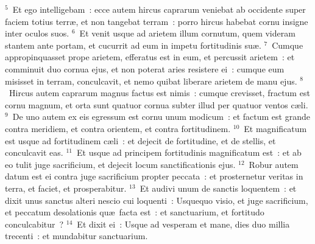 ${}^{5}$~Et ego intelligebam~: ecce autem hircus caprarum veniebat ab occidente super faciem totius terr\ae , et non tangebat terram~: porro hircus habebat cornu insigne inter oculos suos.
${}^{6}$~Et venit usque ad arietem illum cornutum, quem videram stantem ante portam, et cucurrit ad eum in impetu fortitudinis su\ae .
${}^{7}$~Cumque appropinquasset prope arietem, efferatus est in eum, et percussit arietem~: et comminuit duo cornua ejus, et non poterat aries resistere ei~: cumque eum misisset in terram, conculcavit, et nemo quibat liberare arietem de manu ejus.
${}^{8}$~Hircus autem caprarum magnus factus est nimis~: cumque crevisset, fractum est cornu magnum, et orta sunt quatuor cornua subter illud per quatuor ventos c\ae li.
${}^{9}$~De uno autem ex eis egressum est cornu unum modicum~: et factum est grande contra meridiem, et contra orientem, et contra fortitudinem.
${}^{10}$~Et magnificatum est usque ad fortitudinem c\ae li~: et dejecit de fortitudine, et de stellis, et conculcavit eas.
${}^{11}$~Et usque ad principem fortitudinis magnificatum est~: et ab eo tulit juge sacrificium, et dejecit locum sanctificationis ejus.
${}^{12}$~Robur autem datum est ei contra juge sacrificium propter peccata~: et prosternetur veritas in terra, et faciet, et prosperabitur.
${}^{13}$~Et audivi unum de sanctis loquentem~: et dixit unus sanctus alteri nescio cui loquenti~: Usquequo visio, et juge sacrificium, et peccatum desolationis qu\ae\ facta est~: et sanctuarium, et fortitudo conculcabitur~?
${}^{14}$~Et dixit ei~: Usque ad vesperam et mane, dies duo millia trecenti~: et mundabitur sanctuarium.


